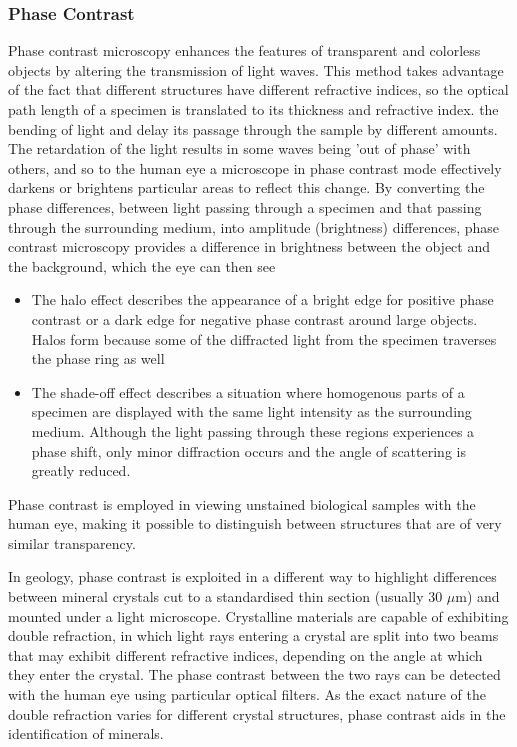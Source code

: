 \documentclass{article}
\begin{document}
\subsubsection{Phase Contrast}
 Phase contrast microscopy enhances the features of transparent and colorless objects by altering the transmission of light waves. This method takes advantage of the fact that different structures have different refractive indices, so the optical path length of a specimen is translated to its thickness and refractive index.  the bending of light and delay its passage through the sample by different amounts. The retardation of the light results in some waves being 'out of phase' with others, and so to the human eye a microscope in phase contrast mode effectively darkens or brightens particular areas to reflect this change. 
 By converting the phase differences, between light passing through a specimen and that passing through the surrounding medium, into amplitude (brightness) differences, phase contrast microscopy provides a difference in brightness between the object and the background, which the eye can then see
  \begin{itemize}
  \item The halo effect describes the appearance of a bright edge for positive phase contrast or a dark edge for negative phase contrast around large objects. Halos form because some of the diffracted light from the specimen traverses the phase ring as well
  \item The shade-off effect describes a situation where homogenous parts of a specimen are displayed with the same light intensity as the surrounding medium. Although the light passing through these regions experiences a phase shift, only minor diffraction occurs and the angle of scattering is greatly reduced. 
\end{itemize}
Phase contrast is employed in viewing unstained biological samples with the human eye, making it possible to distinguish between structures that are of very similar transparency.

In geology, phase contrast is exploited in a different way to highlight differences between mineral crystals cut to a standardised thin section (usually 30 $\mu$m) and mounted under a light microscope. Crystalline materials are capable of exhibiting double refraction, in which light rays entering a crystal are split into two beams that may exhibit different refractive indices, depending on the angle at which they enter the crystal. The phase contrast between the two rays can be detected with the human eye using particular optical filters. As the exact nature of the double refraction varies for different crystal structures, phase contrast aids in the identification of minerals.
\end{document}
